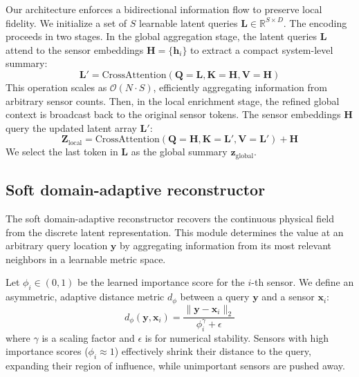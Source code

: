 \documentclass[pdflatex,sn-nature]{sn-jnl}%
\begin{document}
Our architecture enforces a bidirectional information flow to preserve local fidelity. 
We initialize a set of $S$ learnable latent queries $\mathbf{L} \in \mathbb{R}^{S \times D}$. The encoding proceeds in two stages.
In the global aggregation stage, the latent queries $\mathbf{L}$ attend to the sensor embeddings $\mathbf{H} = \{\mathbf{h}_i\}$ to extract a compact system-level summary:
\begin{equation}
    \mathbf{L}' = \text{CrossAttention}(\mathbf{Q}=\mathbf{L}, \mathbf{K}=\mathbf{H}, \mathbf{V}=\mathbf{H})
\end{equation}
This operation scales as $\mathcal{O}(N \cdot S)$, efficiently aggregating information from arbitrary sensor counts.
Then, in the local enrichment stage, the refined global context is broadcast back to the original sensor tokens.
The sensor embeddings $\mathbf{H}$ query the updated latent array $\mathbf{L}'$:
    \begin{equation}
        \mathbf{Z}_{\text{local}} = \text{CrossAttention}(\mathbf{Q}=\mathbf{H}, \mathbf{K}=\mathbf{L}', \mathbf{V}=\mathbf{L}') + \mathbf{H}
    \end{equation}
We select the last token in $\mathbf{L}$ as the global summary $\mathbf{z}_{\text{global}}$.

\subsection*{Soft domain-adaptive reconstructor}
\label{subsec: Reconstructor}

The soft domain-adaptive reconstructor recovers the continuous physical field from the discrete latent representation.
This module determines the value at an arbitrary query location $\mathbf{y}$ by aggregating information from its most relevant neighbors in a learnable metric space.

Let $\phi_i \in (0, 1)$ be the learned importance score for the $i$-th sensor. 
We define an asymmetric, adaptive distance metric $d_{\phi}$ between a query $\mathbf{y}$ and a sensor $\mathbf{x}_i$:
\begin{equation}
    d_{\phi}(\mathbf{y}, \mathbf{x}_i) = \frac{\| \mathbf{y} - \mathbf{x}_i \|_2}{\phi_i^\gamma + \epsilon}
\end{equation}
where $\gamma$ is a scaling factor and $\epsilon$ is for numerical stability. Sensors with high importance scores ($\phi_i \approx 1$) effectively shrink their distance to the query, expanding their region of influence, while unimportant sensors are pushed away.
\end{document}
